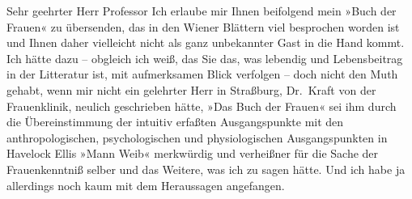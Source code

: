 \pstart\center{}Sehr geehrter Herr Professor\pend\vspace{0.5em}
\pstart
           Ich erlaube mir Ihnen beifolgend mein »Buch der
                  Frauen« zu übersenden, das in den Wiener
               Blättern viel besprochen worden ist und Ihnen daher vielleicht nicht als ganz
               unbekannter Gast in die Hand kommt. Ich hätte \introOben{}dazu\introOben{} –
               obgleich ich weiß, das Sie das, was lebendig und Lebensbeitrag in der Litteratur ist,
               mit aufmerksamen Blick verfolgen – doch nicht den Muth  gehabt, wenn mir nicht ein gelehrter Herr in Straßburg, Dr. Kraft von
               der Frauenklinik, neulich geschrieben hätte,
                  »Das Buch der Frauen« sei ihm durch die
               Übereinstimmung der intuitiv erfaßten Ausgangspunkte mit den anthropologischen,
               psychologischen und physiologischen Ausgangspunkten in Havelock Ellis »Mann {\kaufmannsund} Weib« merkwürdig und verheißner für die Sache
                  {\pb}der Frauenkenntniß selber und das
               Weitere, was ich zu sagen hätte. Und ich habe ja allerdings noch kaum mit dem
               Heraussagen angefangen.\pend
           
